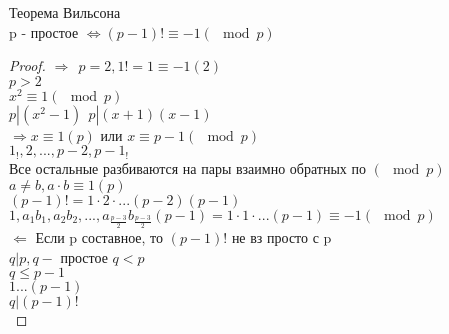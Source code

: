 \begin{theorem}
	Теорема Вильсона \\
	p - простое $ \Leftrightarrow (p-1)! \equiv -1 (\mod p) $ \\
	\begin{proof}
		$ \Rightarrow  \ \ p = 2, 1! = 1 \equiv - 1(2) $ \\
		$ p > 2 $ \\
		$ x^2 \equiv 1 (\mod p) $ \\
		$ p | (x^2 - 1)  \ \ p | (x+1)(x-1) $ \\
		$ \Rightarrow x \equiv 1 (p) $ или $ x \equiv p-1 (\mod p) $ \\
		$ 1_!, 2, ..., p-2, p-1_! $ \\
		Все остальные разбиваются на пары взаимно обратных по $ (\mod p) $ \\
		$ a \neq b, a\cdot b \equiv 1 (p) $ \\
		$ (p-1)! = 1 \cdot 2 \cdot ... (p-2) (p-1) $ \\
		$ 1, a_1b_1, a_2b_2, ... , a_{\frac{p-3}{2}}  b_{\frac{p-3}{2}} (p-1) = 1 \cdot 1 \cdot ... (p-1) \equiv -1 (\mod p) $ \\
		$ \Leftarrow $ Если p составное, то $ (p-1)! $ не вз просто с p\\
		$ q | p, q -$ простое $ q < p $ \\
		$ q \leq p-1 $ \\
		$ 1...(p-1) $\\
		$ q | (p-1)! $ \\		
	\end{proof}
\end{theorem}









